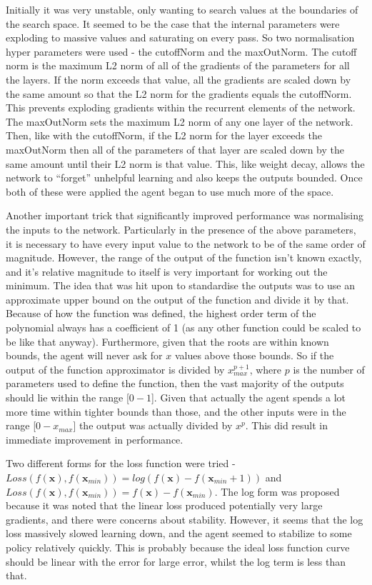 Initially it was very unstable, only wanting to search values at the boundaries of the search space. It seemed to be the case that the internal parameters were exploding to massive values and saturating on every pass. So two normalisation hyper parameters were used - the cutoffNorm and the maxOutNorm. The cutoff norm is the maximum L2 norm of all of the gradients of the parameters for all the layers. If the norm exceeds that value, all the gradients are scaled down by the same amount so that the L2 norm for the gradients equals the cutoffNorm. This prevents exploding gradients within the recurrent elements of the network. The maxOutNorm sets the maximum L2 norm of any one layer of the network. Then, like with the cutoffNorm, if the L2 norm for the layer exceeds the maxOutNorm then all of the parameters of that layer are scaled down by the same amount until their L2 norm is that value. This, like weight decay, allows the network to ``forget'' unhelpful learning and also keeps the outputs bounded. Once both of these were applied the agent began to use much more of the space.

Another important trick that significantly improved performance was normalising the inputs to the network. Particularly in the presence of the above parameters, it is necessary to have every input value to the network to be of the same order of magnitude. However, the range of the output of the function isn't known exactly, and it's relative magnitude to itself is very important for working out the minimum. The idea that was hit upon to standardise the outputs was to use an approximate upper bound on the output of the function and divide it by that. Because of how the function was defined, the highest order term of the polynomial always has a coefficient of 1 (as any other function could be scaled to be like that anyway). Furthermore, given that the roots are within known bounds, the agent will never ask for $x$ values above those bounds. So if the output of the function approximator is divided by $x_{max}^{p+1}$, where $p$ is the number of parameters used to define the function, then the vast majority of the outputs should lie within the range [$0 - 1$]. Given that actually the agent spends a lot more time within tighter bounds than those, and the other inputs were in the range [$0- x_{max} $] the output was actually divided by $x^p$. This did result in immediate improvement in performance.

Two different forms for the loss function were tried - $Loss(f(\boldsymbol{x}), f(\boldsymbol{x}_{min})) = log(f(\boldsymbol{x}) - f(\boldsymbol{x}_{min} +1))$ and $Loss(f(\boldsymbol{x}), f(\boldsymbol{x}_{min})) = f(\boldsymbol{x}) - f(\boldsymbol{x}_{min})$. The log form was proposed because it was noted that the linear loss produced potentially very large gradients, and there were concerns about stability. However, it seems that the log loss massively slowed learning down, and the agent seemed to stabilize to some policy relatively quickly. This is probably because the ideal loss function curve should be linear with the error for large error, whilst the log term is less than that.

